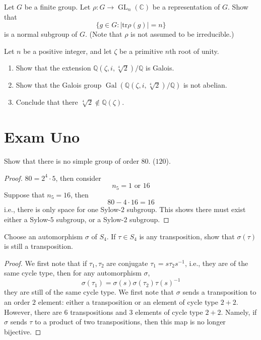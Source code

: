 \documentclass[openany]{book}
\newcommand{\tr}{\text{tr}}
\begin{document}
\begin{prob}
    Let $G$ be a finite group. Let $\rho\colon G\to\operatorname{GL}_n(\mathbb C)$ be a representation of $G$. Show that
    \[\{g\in G:\left|\tr\rho(g)\right|=n\}\]
    is a normal subgroup of $G$. (Note that $\rho$ is not assumed to be irreducible.)
\end{prob}

\begin{prob}
    Let $n$ be a positive integer, and let $\zeta$ be a primitive $n$th root of unity.
    \begin{enumerate}
        \item Show that the extension $\mathbb Q(\zeta,i,\sqrt[4]2)/\mathbb Q$ is Galois.
        \item Show that the Galois group $\operatorname{Gal}(\mathbb Q(\zeta,i,\sqrt[4]2)/\mathbb Q)$ is not abelian.
        \item Conclude that there $\sqrt[4]2\notin\mathbb{Q}(\zeta)$.
    \end{enumerate}
\end{prob}


\chapter{Exam Uno}
\begin{prob}
    Show that there is no simple group of order $80$. ($120$).
\end{prob}
\begin{proof}
    $80=2^4\cdot 5$, then consider 
    \begin{equation*}
        n_5=1 \text{ or } 16
    \end{equation*}
    Suppose that $n_5=16$, then 
    \begin{equation*}
        80-4\cdot 16=16
    \end{equation*}
    i.e., there is only space for one Sylow-$2$ subgroup. This shows there must exist either a Sylow-$5$ subgroup, or a Sylow-$2$ subgroup.
\end{proof}

\begin{prob}
    Choose an automorphism $\sigma$ of $S_4$. If $\tau\in S_4$ is any transposition, show that $\sigma(\tau)$ is still a transposition.
\end{prob}
\begin{proof}
    We first note that if $\tau_1,\tau_2$ are conjugate $\tau_1=s\tau_2s^{-1}$, i.e., they are of the same cycle type, then for any automorphism $\sigma$, 
    \begin{equation*}
        \sigma(\tau_1)=\sigma(s)\sigma(\tau_2)\tau(s)^{-1}
    \end{equation*}
    they are still of the same cycle type. We first note that $\sigma$ sends a transposition to an order $2$ element: either a transposition or an element of cycle type $2+2$. However, there are $6$ transpositions and $3$ elements of cycle type $2+2$. Namely, if $\sigma$ sends $\tau$ to a product of two transpositions, then this map is no longer bijective.
\end{proof}
\end{document}
